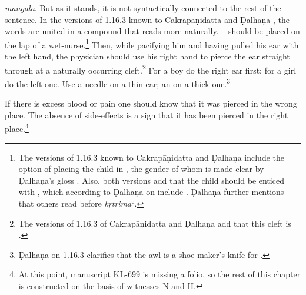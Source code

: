 \begin{translation}
{    \emph{maṅgala}.  But as it stands, it is not syntactically connected to the rest of the sentence. In the versions of 1.16.3 known to Cakrapāṇidatta \citep[126]{acar-1939} and Ḍalhaṇa \citep[76]{vulgate}, the words are united in a compound that reads more naturally.} -- should be placed on the lap of a wet-nurse.\footnote{The versions of 1.16.3 known to Cakrapāṇidatta \citep[126]{acar-1939} and Ḍalhaṇa \citep[76]{vulgate} include the option of placing the child in ,  the gender of whom is made clear by  Ḍalhaṇa's gloss . Also, both versions add that the child should be enticed with , which according to Ḍalhaṇa on  include . Ḍalhaṇa further mentions that others read  before \emph{kṛtrima}°.} Then, while pacifying him and having pulled his ear with the left hand, the physician should use his right hand to pierce the ear straight through at a naturally occurring cleft.\footnote{The versions of 1.16.3 of Cakrapāṇidatta \citep[126]{acar-1939} and Ḍalhaṇa \citep[76]{vulgate} add that this cleft is .} For a boy do
    the right ear first; for a girl do the left one. Use a needle on a
    thin ear; an  on a thick one.\footnote{Ḍalhaṇa on 1.16.3 \citep[76]{vulgate} clarifies that the awl is a shoe-maker's knife for .}
    
    \item [3]  If there is excess blood or pain one should know that it was pierced
    in the wrong place. The absence of side-effects is a sign that it has been pierced 
    in the right place.\footnote{At this point, manuscript KL-699 is missing a folio, so the rest of this chapter
    is constructed on the basis of witnesses N and H.}
    

\end{translation}

